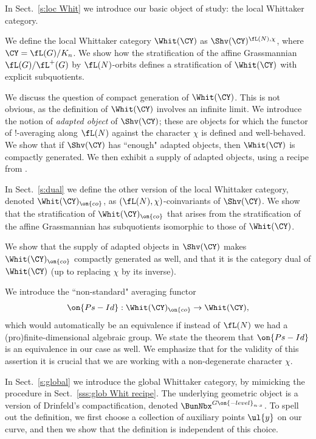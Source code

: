\documentclass[9pt]{amsart}
\theoremstyle{definition}
\theoremstyle{remark}
\newcommand{\secref}[1]{Sect.~\ref{#1}}
\numberwithin{equation}{section}
\begin{document}
In \secref{s:loc Whit} we introduce our basic object of study: the local Whittaker category. 

\medskip

We define the local Whittaker category $\Whit(\CY)$ as $\Shv(\CY)^{\fL(N),\chi}$, where $\CY=\fL(G)/K_n$.
We show how the stratification of the affine Grassmannian $\fL(G)/\fL^+(G)$ by $\fL(N)$-orbits defines a stratification of 
$\Whit(\CY)$ with explicit subquotients.

\medskip

We discuss the question of compact generation of $\Whit(\CY)$. This is not obvious, as the definition of $\Whit(\CY)$
involves an infinite limit. We introduce the notion of \emph{adapted object} of $\Shv(\CY)$; these are objects for
which the functor of !-averaging along $\fL(N)$ against the character $\chi$ is defined and well-behaved. We show
that if $\Shv(\CY)$ has ``enough" adapted objects, then $\Whit(\CY)$ is compactly generated. We then exhibit
a supply of adapted objects, using a recipe from \cite{Ras}. 

\sssec{}

In \secref{s:dual} we define the other version of the local Whittaker category, denoted $\Whit(\CY)_{\on{co}}$,
as $(\fL(N),\chi)$-coinvariants of $\Shv(\CY)$. We show that the stratification of $\Whit(\CY)_{\on{co}}$ 
that arises from the stratification of the affine Grassmannian has subquotients isomorphic to those of 
$\Whit(\CY)$. 

\medskip

We show that the supply of adapted objects in $\Shv(\CY)$
makes $\Whit(\CY)_{\on{co}}$ compactly generated as well, and that it is the category dual of $\Whit(\CY)$
(up to replacing $\chi$ by its inverse). 

\medskip

We introduce the ``non-standard" averaging functor 
\begin{equation} \label{e:PsId intro}
\on{Ps-Id}:\Whit(\CY)_{\on{co}}\to \Whit(\CY),
\end{equation}
which would automatically be an equivalence if instead of $\fL(N)$ we had a (pro)finite-dimensional algebraic
group. We state the theorem that $\on{Ps-Id}$ is an equivalence in our case as well. We emphasize that
for the validity of this assertion it is crucial that we are working with a non-degenerate character $\chi$. 

\sssec{}

In \secref{s:global} we introduce the global Whittaker category, by mimicking the procedure in \secref{sss:glob Whit recipe}.
The underlying geometric object is a version of Drinfeld's compactification, denoted $\BunNbx^{G\on{-level}_{n\cdot x}}$. 
To spell out the definition, we first choose a collection of auxiliary points $\ul{y}$ on our curve, and then we show that the
definition is independent of this choice. 
\end{document}
